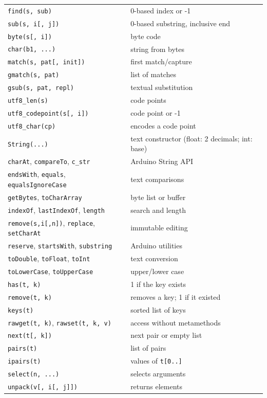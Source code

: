 \documentclass[11pt,a4paper,oneside]{report}
\newcommand{\code}[1]{\texttt{#1}}
\begin{document}
\begin{longtable}{@{}L{4.8cm}L{10.5cm}@{}}
\code{find(s, sub)} & 0-based index or -1 \\
\code{sub(s, i[, j])} & 0-based substring, inclusive end \\
\code{byte(s[, i])} & byte code \\
\code{char(b1, ...)} & string from bytes \\
\code{match(s, pat[, init])} & first match/capture \\
\code{gmatch(s, pat)} & list of matches \\
\code{gsub(s, pat, repl)} & textual substitution \\
\code{utf8\_len(s)} & code points \\
\code{utf8\_codepoint(s[, i])} & code point or -1 \\
\code{utf8\_char(cp)} & encodes a code point \\
\code{String(...)} & text constructor (float: 2 decimals; int: base) \\
\code{charAt}, \code{compareTo}, \code{c\_str} & Arduino String API \\
\code{endsWith}, \code{equals}, \code{equalsIgnoreCase} & text comparisons \\
\code{getBytes}, \code{toCharArray} & byte list or buffer \\
\code{indexOf}, \code{lastIndexOf}, \code{length} & search and length \\
\code{remove(s,i[,n])}, \code{replace}, \code{setCharAt} & immutable editing \\
\code{reserve}, \code{startsWith}, \code{substring} & Arduino utilities \\
\code{toDouble}, \code{toFloat}, \code{toInt} & text conversion \\
\code{toLowerCase}, \code{toUpperCase} & upper/lower case \\
\midrule
\code{has(t, k)} & 1 if the key exists \\
\code{remove(t, k)} & removes a key; 1 if it existed \\
\code{keys(t)} & sorted list of keys \\
\code{rawget(t, k)}, \code{rawset(t, k, v)} & access without metamethods \\
\code{next(t[, k])} & next pair or empty list \\
\code{pairs(t)} & list of pairs \\
\code{ipairs(t)} & values of \code{t[0..]} \\
\code{select(n, ...)} & selects arguments \\
\code{unpack(v[, i[, j]])} & returns elements \\

\end{longtable}
\end{document}
